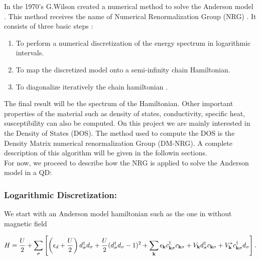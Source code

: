 In the 1970's G.Wilson created a numerical method to solve the Anderson model . This method receives the name of Numerical Renormalization Group (NRG) \citep{bulla_numerical_2008,wilson_renormalization_1975,krishna-murthy_renormalization-group_1980}. It consists of three basic steps :
\begin{enumerate}
\item To perform a numerical discretization of the energy spectrum in logarithmic intervals. 
\item To map the discretized model onto a semi-infinity chain Hamiltonian. 
\item  To diagonalize iteratively the chain hamiltonian . 
\end{enumerate}

The final result will be the spectrum of the Hamiltonian. Other important properties of the material such as density of states, conductivity, specific heat, susceptibility can also be computed. On this project we are mainly interested in the Density of States (DOS). The method used to compute the DOS is the Density Matrix numerical renormalization Group (DM-NRG). A complete description of this algorithm will be given in the followin sections.  \\

For now, we proceed to describe how the NRG is applied to solve the Anderson model in a QD:\\


\subsubsection{Logarithmic Discretization:}



We start with an Anderson model hamiltonian such as the one 
in  without magnetic field

\begin{equation}
H=\frac{U}{2}+\sum_{\sigma}\left[\left(\epsilon_{d}+\frac{U}{2}\right)d_{\sigma}^{\dagger}d_{\sigma}+\frac{U}{2}(d_{\sigma}^{\dagger}d_{\sigma}-1)^{2}+\sum_{\mathbf{k}}\epsilon_{\mathbf{k}}c_{\mathbf{k}\sigma}^{\dagger}c_{\mathbf{k}\sigma}+V_{\mathbf{k}}d_{\sigma}^{\dagger}c_{\mathbf{k}\sigma}+V_{\mathbf{k}}^{*}c_{\mathbf{k}\sigma}^{\dagger}d_{\sigma}\right].\label{HamWilson}
\end{equation}

